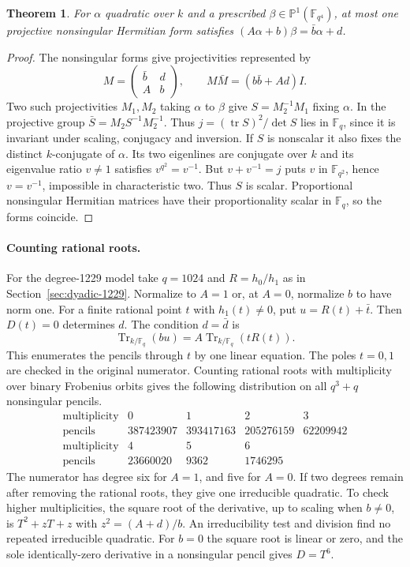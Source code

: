 \documentclass[11pt]{article}
\newtheorem{theorem}{Theorem}
\begin{document}
\begin{theorem}
For \(\alpha\) quadratic over \(k\) and a prescribed
\(\beta\in\mathbb P^1(\mathbb F_{q^4})\), at most one projective
nonsingular Hermitian form satisfies
\((A\alpha+b)\beta=\bar b\alpha+d\).
\end{theorem}
\begin{proof}
The nonsingular forms give projectivities represented by
\[
      M=\begin{pmatrix}\bar b&d\\A&b\end{pmatrix},
       \qquad M\bar M=(b\bar b+Ad)I .
\]
Two such projectivities \(M_1,M_2\) taking \(\alpha\) to \(\beta\)
give \(S=M_2^{-1}M_1\) fixing \(\alpha\). In the projective group
\(\bar S=M_2 S^{-1}M_2^{-1}\). Thus
\(j=(\operatorname{tr}S)^2/\det S\) lies in \(\mathbb F_q\),
since it is invariant under scaling, conjugacy and inversion.
If \(S\) is nonscalar it also fixes the distinct \(k\)-conjugate of
\(\alpha\). Its two eigenlines are conjugate over \(k\) and its
eigenvalue ratio \(v\ne1\) satisfies \(v^{q^2}=v^{-1}\).
But \(v+v^{-1}=j\) puts \(v\) in \(\mathbb F_{q^2}\), hence
\(v=v^{-1}\), impossible in characteristic two. Thus \(S\) is
scalar. Proportional nonsingular Hermitian matrices have their
proportionality scalar in \(\mathbb F_q\), so the forms coincide.
\end{proof}

\paragraph{Counting rational roots.}
For the degree-1229 model take \(q=1024\) and \(R=h_0/h_1\) as
in Section~\ref{sec:dyadic-1229}. Normalize to \(A=1\) or, at
\(A=0\), normalize \(b\) to have norm one. For a finite rational
point \(t\) with \(h_1(t)\ne0\), put \(u=R(t)+\bar t\).
Then \(D(t)=0\) determines \(d\). The condition \(d=\bar d\) is
\[
     \operatorname{Tr}_{k/\mathbb F_q}(bu)
       =A\operatorname{Tr}_{k/\mathbb F_q}(tR(t)).
\]
This enumerates the pencils through \(t\) by one linear equation.
The poles \(t=0,1\) are checked in the original numerator.
Counting rational roots with multiplicity over binary Frobenius
orbits gives the following distribution on all \(q^3+q\)
nonsingular pencils.
\[
\begin{array}{c|rrrr}
\text{multiplicity}&0&1&2&3\\\hline
\text{pencils}&387423907&393417163&205276159&62209942\\
\text{multiplicity}&4&5&6&\\\hline
\text{pencils}&23660020&9362&1746295&
\end{array}
\]
The numerator has degree six for \(A=1\), and five for \(A=0\).
If two degrees remain after removing the rational roots, they give
one irreducible quadratic. To check higher multiplicities, the
square root of the derivative, up to scaling when \(b\ne0\), is
\(T^2+zT+z\) with \(z^2=(A+d)/b\). An irreducibility test and
division find no repeated irreducible quadratic. For \(b=0\) the
square root is linear or zero, and the sole identically-zero
derivative in a nonsingular pencil gives \(D=T^6\).
\end{document}
